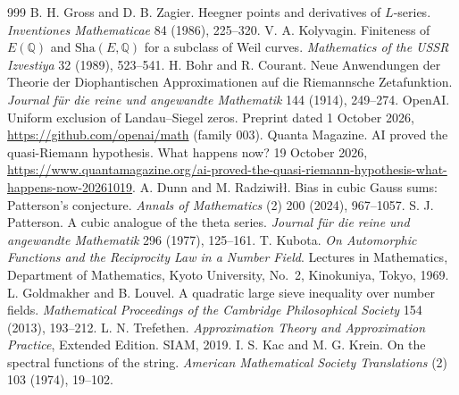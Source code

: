 \begin{thebibliography}{999}
 B. H. Gross and D. B. Zagier. Heegner points and derivatives of $L$-series. \emph{Inventiones Mathematicae} 84 (1986), 225--320. %
 V. A. Kolyvagin. Finiteness of $E(\mathbb Q)$ and $\mathrm{Sha}(E,\mathbb Q)$ for a subclass of Weil curves. \emph{Mathematics of the USSR Izvestiya} 32 (1989), 523--541. %
 H. Bohr and R. Courant. Neue Anwendungen der Theorie der Diophantischen Approximationen auf die Riemannsche Zetafunktion. \emph{Journal f\"ur die reine und angewandte Mathematik} 144 (1914), 249--274. %
 OpenAI. Uniform exclusion of Landau--Siegel zeros. Preprint dated 1 October 2026, \url{https://github.com/openai/math} (family 003). %
 Quanta Magazine. AI proved the quasi-Riemann hypothesis. What happens now? 19 October 2026, \url{https://www.quantamagazine.org/ai-proved-the-quasi-riemann-hypothesis-what-happens-now-20261019}. %
 A. Dunn and M. Radziwi\l\l. Bias in cubic Gauss sums: Patterson's conjecture. \emph{Annals of Mathematics} (2) 200 (2024), 967--1057. %
 S. J. Patterson. A cubic analogue of the theta series. \emph{Journal f\"ur die reine und angewandte Mathematik} 296 (1977), 125--161. %
 T. Kubota. \emph{On Automorphic Functions and the Reciprocity Law in a Number Field}. Lectures in Mathematics, Department of Mathematics, Kyoto University, No.~2, Kinokuniya, Tokyo, 1969. %
 L. Goldmakher and B. Louvel. A quadratic large sieve inequality over number fields. \emph{Mathematical Proceedings of the Cambridge Philosophical Society} 154 (2013), 193--212. %
 L. N. Trefethen. \emph{Approximation Theory and Approximation Practice}, Extended Edition. SIAM, 2019.
 I. S. Kac and M. G. Krein. On the spectral functions of the string. \emph{American Mathematical Society Translations} (2) 103 (1974), 19--102.


\end{thebibliography}
